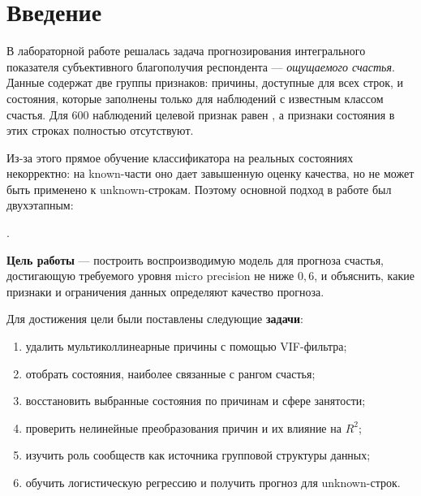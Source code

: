 \section*{Введение}

В лабораторной работе решалась задача прогнозирования интегрального показателя
субъективного благополучия респондента --- \textit{ощущаемого счастья}. Данные
содержат две группы признаков: причины, доступные для всех строк, и состояния,
которые заполнены только для наблюдений с известным классом счастья. Для 600
наблюдений целевой признак равен , а признаки состояния в этих
строках полностью отсутствуют.

Из-за этого прямое обучение классификатора на реальных состояниях некорректно:
на known-части оно дает завышенную оценку качества, но не может быть применено к
unknown-строкам. Поэтому основной подход в работе был двухэтапным:
\begin{center}
.
\end{center}

\textbf{Цель работы} --- построить воспроизводимую модель для прогноза счастья,
достигающую требуемого уровня micro precision не ниже $0{,}6$, и объяснить,
какие признаки и ограничения данных определяют качество прогноза.

Для достижения цели были поставлены следующие \textbf{задачи}:
\begin{enumerate}[noitemsep]
    \item удалить мультиколлинеарные причины с помощью VIF-фильтра;
    \item отобрать состояния, наиболее связанные с рангом счастья;
    \item восстановить выбранные состояния по причинам и сфере занятости;
    \item проверить нелинейные преобразования причин и их влияние на $R^2$;
    \item изучить роль сообществ как источника групповой структуры данных;
    \item обучить логистическую регрессию и получить прогноз для unknown-строк.
\end{enumerate}

\newpage
